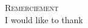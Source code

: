 \begin{center}
                \textsc{\Large Remerciement}\\

		\vspace{2cm}
		I would like to thank

	\newpage	
\end{center}


